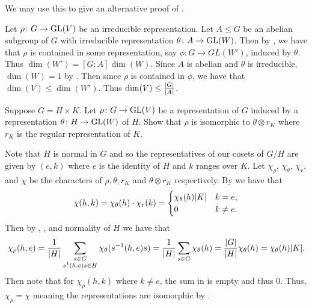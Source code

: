 \documentclass[letterpaper, 11pt, oneside]{book}
\begin{document}
\clearpage

We may use this to give an alternative proof of .
\begin{pf}
  Let $\rho\colon G \to \operatorname{GL}(V)$ be an irreducible representation.
  Let $A \leq G$ be an abelian subgroup of $G$ with irreducible representation $\theta\colon A \to \operatorname{GL}(W)$.
  Then by , we have that $\rho$ is contained in some representation, say $\phi\colon G \to GL(W')$, induced by $\theta$.
  Thus $\dim(W') = [G \colon A] \dim(W)$.
  Since $A$ is abelian and $\theta$ is irreducible, $\dim(W) = 1$ by .
  Then since $\rho$ is contained in $\phi$, we have that $\dim(V) \leq \dim(W')$.
  Thus $\dim(V) \leq \frac{\abs{G}}{\abs{A}}$.
\end{pf}

\begin{exercise}
  Suppose $G = H \times K$.
  Let $\rho\colon G \to \operatorname{GL}(V)$ be a representation of $G$ induced by a representation $\theta\colon H \to \operatorname{GL}(W)$ of $H$.
  Show that $\rho$ is isomorphic to $\theta \otimes r_{K}$ where $r_{K}$ is the regular representation of $K$.
\end{exercise}
\begin{pf}
  Note that $H$ is normal in $G$ and so the representatives of our cosets of $G / H$ are given by $(e, k)$ where $e$ is the identity of $H$ and $k$ ranges over $K$.
  Let $\chi_{\rho}$, $\chi_{\theta}$, $\chi_{r}$, and $\chi$ be the characters of $\rho, \theta, r_{K}$ and $\theta \otimes r_{K}$ respectively.
  By  we have that
  \[
    \chi(h, k) = \chi_{\theta}(h) \cdot \chi_{r}(k) = \begin{cases}
                                                        \chi_{\theta}(h) \abs{K} & k = e, \\
                                                        0 & k \neq e.
                                                      \end{cases}
  \]
  Then by , , and normality of $H$ we have that
  \[
    \chi_{\rho}(h, e) = \frac{1}{\abs{H}} \sum_{\substack{s \in G \\ s^{1} (h, e) s \in H}} \chi_{\theta}(s^{-1} (h, e) s) = \frac{1}{\abs{H}} \sum_{s \in G} \chi_{\theta}(h) = \frac{\abs{G}}{\abs{H}} \chi_{\theta}(h) = \chi_{\theta}(h) \abs{K}.
  \]
  Then note that for $\chi_{\rho}(h, k)$ where $k \neq e$, the sum in  is empty and thus $0$.
  Thus, $\chi_{\rho} = \chi$ meaning the representations are isomorphic by .
\end{pf}
\end{document}
